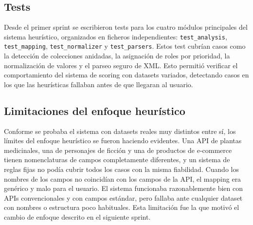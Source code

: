\subsection{Tests}
\label{subsec:test1}

Desde el primer sprint se escribieron tests para los cuatro módulos principales 
del sistema heurístico, organizados en ficheros independientes: 
\texttt{test\_analysis}, \texttt{test\_mapping}, \texttt{test\_normalizer} 
y \texttt{test\_parsers}. Estos test cubrían casos como la detección de colecciones anidadas, la asignación de roles por prioridad, la normalización de valores y el parseo seguro de XML. Esto permitió verificar el comportamiento del sistema de scoring con datasets variados, detectando casos en los que las heurísticas fallaban antes de que llegaran al usuario.

\subsection*{Limitaciones del enfoque heurístico} 
\label{subsec:limitaciones1}

Conforme se probaba el sistema con datasets reales muy distintos entre sí, los límites del enfoque heurístico se fueron haciendo evidentes. Una API de plantas medicinales, una de personajes de ficción y una de productos de e-commerce tienen nomenclaturas de campos completamente diferentes, y un sistema de reglas fijas no podía cubrir todos los casos con la misma fiabilidad. Cuando los nombres de los campos no coincidían con los campos de la API, el mapping era genérico y malo para el usuario. El sistema funcionaba razonablemente bien con APIs convencionales y con campos estándar, pero fallaba ante cualquier dataset con nombres o estructura poco habituales. Esta limitación fue la que motivó el cambio de enfoque descrito en el siguiente sprint.


